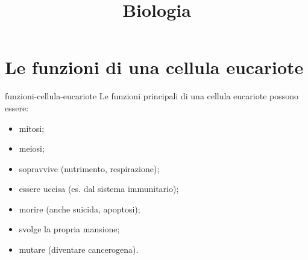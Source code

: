 \documentclass[preview]{standalone}
\begin{document}
\title{Biologia}
\genpage

\section{Le funzioni di una cellula eucariote}

\begin{snippet}{funzioni-cellula-eucariote}
    Le funzioni principali di una cellula eucariote possono essere:

    \begin{itemize}
        \item mitosi;
        \item meiosi;
        \item sopravvive (nutrimento, respirazione);
        \item essere uccisa (es. dal sistema immunitario);
        \item morire (anche suicida, apoptosi);
        \item svolge la propria mansione;
        \item mutare (diventare cancerogena).
    \end{itemize}
\end{snippet}
\end{document}
